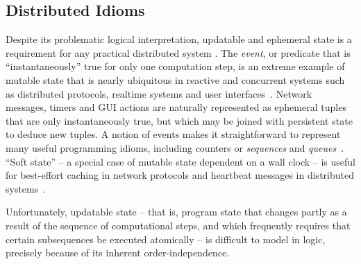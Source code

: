 \subsection{Distributed Idioms}

Despite its problematic logical interpretation, updatable and ephemeral state is a requirement
for any practical distributed system .  The \emph{event}, or predicate that is ``instantaneously''
true for only one computation step, is an extreme example of mutable state that is nearly
ubiquitous in reactive and concurrent systems such as distributed protocols, realtime systems
and user interfaces~\cite{prologevents}.
Network messages, timers and GUI actions are
naturally represented as ephemeral tuples that are only instantaneously true, 
but which may be joined with persistent state to deduce new
tuples.  A notion of events makes it straightforward to represent many useful
programming idioms, including counters or \emph{sequences} and
\emph{queues}~\cite{netdb}.
``Soft state'' -- a special case of mutable state dependent on a wall clock -- 
is  useful for best-effort
caching in network protocols and heartbeat messages in distributed
systems~\cite{boom-eurosys}.  

Unfortunately, updatable state -- that is, program state that changes partly as a result of the 
sequence of computational steps, and which frequently requires that certain subsequences be executed atomically -- is difficult to model in logic, precisely because of its inherent order-independence.  


\begin{comment}
For example,  an Overlog sequence might be
specified in the following fashion:

\wrm{again, it seems like we're delving into a highly technical and domain-specific explanation of the flaws of previous work.  maybe we don't need to do this.}

\begin{Dedalus}
seq(To, X+1) \(\leftarrow\) 
  seq(To, X), ping(To, From);
\end{Dedalus}

The structure and intent of the rule above are fairly obvious \wrm{a logician would have a different interpretation.  maybe you can cast this interpretation as intuitive by thinking of Datalog in an ECA-like way.}: when a \emph{ping} event
occurs, the current value X of the sequence\emph{seq} should be incremented.  Upon
closer inspection, however, we see that the rule has an unambiguous meaning only under
an operational interpretation of the system's semantics: precisely because \emph{ping}
is ephemeral, we know that the arrival of a \emph{ping} tuple will ``trigger'' the rule, and 
the insertion of the new sequence value will not retrigger it, causing an infinite chain of
deductions.  The queue pattern, which enables ordered processing of a set, is slightly 
more complicated:


\end{comment}

